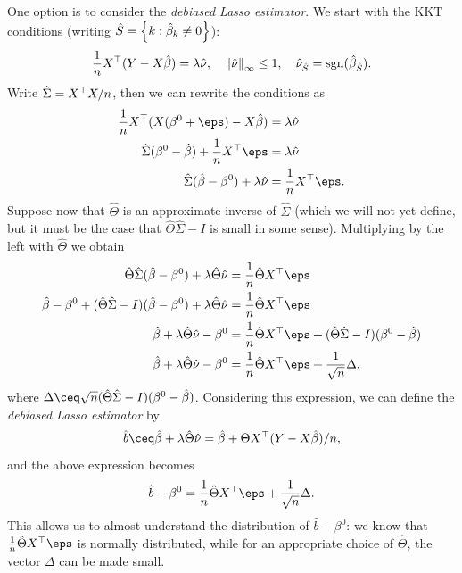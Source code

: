One option is to consider the \emph{debiased Lasso estimator}. 
We start with the KKT conditions (writing $\hat S = \qty{k : \hat\beta_k \neq 0}$): 
\[
\frac1n X^\top (Y - X\hat\beta) = \lambda\hat\nu, \quad \norm{\hat\nu}_\infty \leq 1, \quad \hat\nu_{\hat S} = \operatorname{sgn}(\hat\beta_{\hat S}). 
\]
Write $\hat\Sigma = X^\top X / n$, then we can rewrite the conditions as
\begin{align*}
	\frac1n X\T (X(\beta^0 + \eps) - X\hat\beta) &= \lambda\hat\nu \\
	\hat\Sigma(\beta^0 - \hat\beta) + \frac1nX\T\eps &= \lambda\hat\nu \\
	\hat\Sigma(\hat\beta - \beta^0) + \lambda\hat\nu &= \frac1nX\T \eps. 
\end{align*}
Suppose now that $\hat\Theta$ is an approximate inverse of $\hat\Sigma$ (which we will not yet define, but it must be the case that $\hat\Theta\hat\Sigma - I$ is small in some sense). Multiplying by the left with $\hat\Theta$ we obtain
\begin{align*}
	\hat\Theta\hat\Sigma (\hat\beta - \beta^0) + \lambda\hat\Theta \hat\nu &= \frac1n \hat\Theta X\T\eps \\
	\hat\beta - \beta^0 + (\hat\Theta\hat\Sigma - I)(\hat\beta - \beta^0) + \lambda\hat\Theta\hat\nu &= \frac1n \hat\Theta X\T \eps \\
	\hat\beta + \lambda\hat\Theta\hat\nu - \beta^0 &= \frac1n \hat\Theta X\T \eps + (\hat\Theta\hat\Sigma - I)(\beta^0 - \hat\beta) \\
	\hat\beta + \lambda\hat\Theta\hat\nu - \beta^0 &= \frac1n \hat\Theta X\T\eps + \frac1{\sqrt n} \Delta, 
\end{align*}
where $\Delta \ceq \sqrt n(\hat\Theta\hat\Sigma - I)(\beta^0 - \hat\beta)$. Considering this expression, we can define the \emph{debiased Lasso estimator} by
\[
\hat b \ceq \hat\beta + \lambda \hat\Theta \hat\nu  = \hat\beta  + \Theta X\T (Y - X\hat\beta) / n, 
\]
and the above expression becomes
\begin{equation}\label{eq:debiased_lasso_error}
	\hat b - \beta^0 = \frac1n \hat\Theta X\T\eps + \frac1{\sqrt n} \Delta. 
\end{equation}
This allows us to almost understand the distribution of $\hat b - \beta^0$: we know that $\frac1n \hat\Theta X\T\eps$ is normally distributed, while for an appropriate choice of $\hat\Theta$, the vector $\Delta$ can be made small. 

